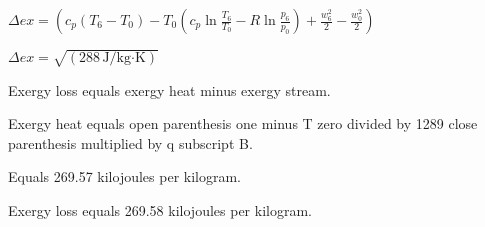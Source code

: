 \( \Delta ex = \left( c_p (T_6 - T_0) - T_0 \left( c_p \ln \frac{T_6}{T_0} - R \ln \frac{p_6}{p_0} \right) + \frac{w_6^2}{2} - \frac{w_0^2}{2} \right) \)  

\( \Delta ex = \sqrt{\left( 288 \, \text{J/kg·K} \right)} \)

Exergy loss equals exergy heat minus exergy stream.  

Exergy heat equals open parenthesis one minus T zero divided by 1289 close parenthesis multiplied by q subscript B.  

Equals 269.57 kilojoules per kilogram.  

Exergy loss equals 269.58 kilojoules per kilogram.